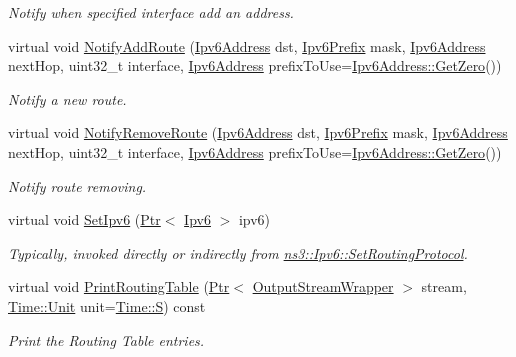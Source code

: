 \begin{DoxyCompactItemize}
\begin{DoxyCompactList}\small\item\em Notify when specified interface add an address. \end{DoxyCompactList}\item 
virtual void \hyperlink{classns3_1_1Ipv6StaticRouting_aaae863ba89a47ad659fb5dc3602c9e24}{Notify\+Add\+Route} (\hyperlink{classns3_1_1Ipv6Address}{Ipv6\+Address} dst, \hyperlink{classns3_1_1Ipv6Prefix}{Ipv6\+Prefix} mask, \hyperlink{classns3_1_1Ipv6Address}{Ipv6\+Address} next\+Hop, uint32\+\_\+t interface, \hyperlink{classns3_1_1Ipv6Address}{Ipv6\+Address} prefix\+To\+Use=\hyperlink{classns3_1_1Ipv6Address_a63a34bdb1505e05fbdd07d316d0bd7e6}{Ipv6\+Address\+::\+Get\+Zero}())
\begin{DoxyCompactList}\small\item\em Notify a new route. \end{DoxyCompactList}\item 
virtual void \hyperlink{classns3_1_1Ipv6StaticRouting_aee1c676f218334e82bbbaf695aa93514}{Notify\+Remove\+Route} (\hyperlink{classns3_1_1Ipv6Address}{Ipv6\+Address} dst, \hyperlink{classns3_1_1Ipv6Prefix}{Ipv6\+Prefix} mask, \hyperlink{classns3_1_1Ipv6Address}{Ipv6\+Address} next\+Hop, uint32\+\_\+t interface, \hyperlink{classns3_1_1Ipv6Address}{Ipv6\+Address} prefix\+To\+Use=\hyperlink{classns3_1_1Ipv6Address_a63a34bdb1505e05fbdd07d316d0bd7e6}{Ipv6\+Address\+::\+Get\+Zero}())
\begin{DoxyCompactList}\small\item\em Notify route removing. \end{DoxyCompactList}\item 
virtual void \hyperlink{classns3_1_1Ipv6StaticRouting_a05569b3f3a6042a7e12a50fe88ee11e7}{Set\+Ipv6} (\hyperlink{classns3_1_1Ptr}{Ptr}$<$ \hyperlink{classns3_1_1Ipv6}{Ipv6} $>$ ipv6)
\begin{DoxyCompactList}\small\item\em Typically, invoked directly or indirectly from \hyperlink{classns3_1_1Ipv6_aa889d2174527a1df773d65974de83f8f}{ns3\+::\+Ipv6\+::\+Set\+Routing\+Protocol}. \end{DoxyCompactList}\item 
virtual void \hyperlink{classns3_1_1Ipv6StaticRouting_a39ea5334065001c093c8165d6a282550}{Print\+Routing\+Table} (\hyperlink{classns3_1_1Ptr}{Ptr}$<$ \hyperlink{classns3_1_1OutputStreamWrapper}{Output\+Stream\+Wrapper} $>$ stream, \hyperlink{classns3_1_1Time_a87a7f4d29c68b047a72d291ad660295a}{Time\+::\+Unit} unit=\hyperlink{classns3_1_1Time_a87a7f4d29c68b047a72d291ad660295aade8622b06524a328cd3a59db6ccf76af}{Time\+::S}) const 
\begin{DoxyCompactList}\small\item\em Print the Routing Table entries. \end{DoxyCompactList}\end{DoxyCompactItemize}
